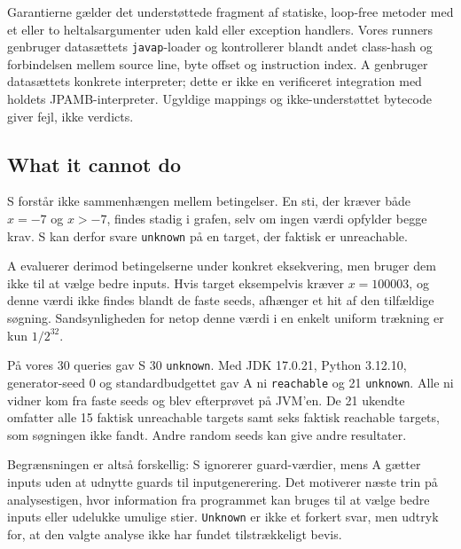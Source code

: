Garantierne g{\ae}lder det underst{\o}ttede fragment af statiske, loop-free
metoder med et eller to heltalsargumenter uden kald eller exception handlers.
Vores runners genbruger datas{\ae}ttets \texttt{javap}-loader og kontrollerer
blandt andet class-hash og forbindelsen mellem source line, byte offset og
instruction index. A genbruger datas{\ae}ttets konkrete interpreter; dette
er ikke en verificeret integration med holdets JPAMB-interpreter.
Ugyldige mappings og ikke-underst{\o}ttet bytecode giver fejl, ikke verdicts.

\subsection{What it cannot do}
S forst{\aa}r ikke sammenh{\ae}ngen mellem betingelser. En sti, der kr{\ae}ver
b{\aa}de $x=-7$ og $x>-7$, findes stadig i grafen, selv om ingen v{\ae}rdi
opfylder begge krav. S kan derfor svare \texttt{unknown} p{\aa} en target,
der faktisk er unreachable.

A evaluerer derimod betingelserne under konkret eksekvering, men bruger dem
ikke til at v{\ae}lge bedre inputs. Hvis target eksempelvis kr{\ae}ver
$x=100003$, og denne v{\ae}rdi ikke findes blandt de faste seeds, afh{\ae}nger
et hit af den tilf{\ae}ldige s{\o}gning. Sandsynligheden for netop denne
v{\ae}rdi i en enkelt uniform tr{\ae}kning er kun $1/2^{32}$.

P{\aa} vores 30 queries gav S 30 \texttt{unknown}. Med JDK 17.0.21,
Python 3.12.10, generator-seed 0 og standardbudgettet gav A ni
\texttt{reachable} og 21 \texttt{unknown}. Alle ni vidner kom fra faste
seeds og blev efterpr{\o}vet p{\aa} JVM'en. De 21 ukendte omfatter alle
15 faktisk unreachable targets samt seks faktisk reachable targets,
som s{\o}gningen ikke fandt. Andre random seeds kan give andre resultater.

Begr{\ae}nsningen er alts{\aa} forskellig: S ignorerer guard-v{\ae}rdier,
mens A g{\ae}tter inputs uden at udnytte guards til inputgenerering.
Det motiverer n{\ae}ste trin p{\aa} analysestigen, hvor information fra
programmet kan bruges til at v{\ae}lge bedre inputs eller udelukke
umulige stier. \texttt{Unknown} er ikke et forkert svar, men udtryk for,
at den valgte analyse ikke har fundet tilstr{\ae}kkeligt bevis.
